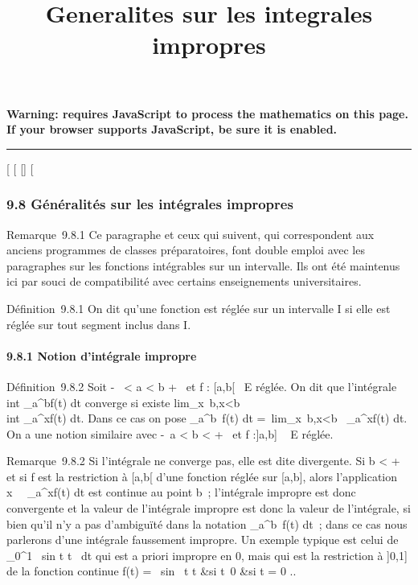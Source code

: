 \documentclass[]{article}
\title{Generalites sur les integrales impropres}
\author{}
\date{}
\begin{document}
\maketitle

\textbf{Warning: 
requires JavaScript to process the mathematics on this page.\\ If your
browser supports JavaScript, be sure it is enabled.}

\begin{center}\rule{3in}{0.4pt}\end{center}

{[}
{[}
{[}{]}
{[}

\subsubsection{9.8 Généralités sur les intégrales impropres}

Remarque~9.8.1 Ce paragraphe et ceux qui suivent, qui correspondent aux
anciens programmes de classes préparatoires, font double emploi avec les
paragraphes sur les fonctions intégrables sur un intervalle. Ils ont été
maintenus ici par souci de compatibilité avec certains enseignements
universitaires.

Définition~9.8.1 On dit qu'une fonction est réglée sur un intervalle I
si elle est réglée sur tout segment inclus dans I.

\paragraph{9.8.1 Notion d'intégrale impropre}

Définition~9.8.2 Soit -\infty~ \textless{} a \textless{} b \leq +\infty~ et f :
{[}a,b{[}\rightarrow~ E réglée. On dit que l'intégrale \\int
 \_a^bf(t) dt converge si existe
lim\_x\rightarrow~b,x\textless{}b~\\int
 \_a^xf(t) dt. Dans ce cas on pose
\int  \_a^b~f(t) dt
=\
lim\_x\rightarrow~b,x\textless{}b\int ~
\_a^xf(t) dt. On a une notion similaire avec -\infty~\leq a
\textless{} b \textless{} +\infty~ et f :{]}a,b{]} \rightarrow~ E réglée.

Remarque~9.8.2 Si l'intégrale ne converge pas, elle est dite divergente.
Si b \textless{} +\infty~ et si f est la restriction à {[}a,b{[} d'une
fonction réglée sur {[}a,b{]}, alors l'application
x\mapsto~\int ~
\_a^xf(t) dt est continue au point b~; l'intégrale impropre
est donc convergente et la valeur de l'intégrale impropre est donc la
valeur de l'intégrale, si bien qu'il n'y a pas d'ambiguïté dans la
notation \int  \_a^b~f(t) dt~; dans
ce cas nous parlerons d'une intégrale faussement impropre. Un exemple
typique est celui de \int  \_0^1~
sin t \over t~ dt qui est a
priori impropre en 0, mais qui est la restriction à {]}0,1{]} de la
fonction continue f(t) = \left \
\cases  sin~ t
\over t &si t\neq~0
 &si t = 0 \cr 
\right ..
\end{document}
